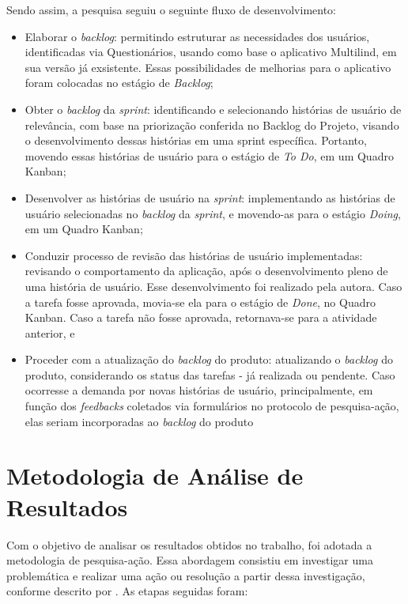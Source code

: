 Sendo assim, a pesquisa seguiu o seguinte fluxo de desenvolvimento:

\begin{itemize}
	\item Elaborar o \textit{backlog}: permitindo estruturar as necessidades dos usuários, identificadas via Questionários, usando como base o aplicativo Multilind, em sua versão já exsistente. Essas possibilidades de melhorias para o aplicativo foram colocadas no estágio de \textit{Backlog};
	\item Obter o \textit{backlog} da \textit{sprint}:  identificando e selecionando histórias de usuário de relevância, com base na priorização conferida no Backlog do Projeto, visando o desenvolvimento dessas histórias em uma sprint específica. Portanto, movendo essas histórias de usuário para o estágio de
	\textit{To Do}, em um Quadro Kanban;
	\item Desenvolver as histórias de usuário na \textit{sprint}: implementando as histórias de usuário selecionadas no \textit{backlog} da \textit{sprint}, e movendo-as para o estágio \textit{Doing}, em um Quadro Kanban;
	\item Conduzir processo de revisão das histórias de usuário implementadas: revisando o comportamento da aplicação, após o desenvolvimento pleno de uma história de usuário. Esse desenvolvimento foi realizado pela autora. Caso a tarefa fosse
	aprovada, movia-se ela para o estágio de \textit{Done}, no Quadro Kanban. Caso a tarefa não fosse aprovada, retornava-se para a atividade anterior, e
	\item Proceder com a atualização do \textit{backlog} do produto: atualizando o \textit{backlog} do produto, considerando os status das tarefas - já realizada ou pendente. Caso ocorresse a demanda por novas histórias de usuário, principalmente, em função dos \textit{feedbacks} coletados via formulários no protocolo de pesquisa-ação, elas seriam incorporadas ao \textit{backlog} do produto
\end{itemize}

\section{Metodologia de Análise de Resultados}
\label{sec:Metodologia de Analise de Resultados}
Com o objetivo de analisar os resultados obtidos no trabalho, foi adotada a metodologia de pesquisa-ação. Essa abordagem consistiu em investigar uma problemática e realizar uma ação ou resolução a partir dessa investigação, conforme descrito por . As etapas seguidas foram:


